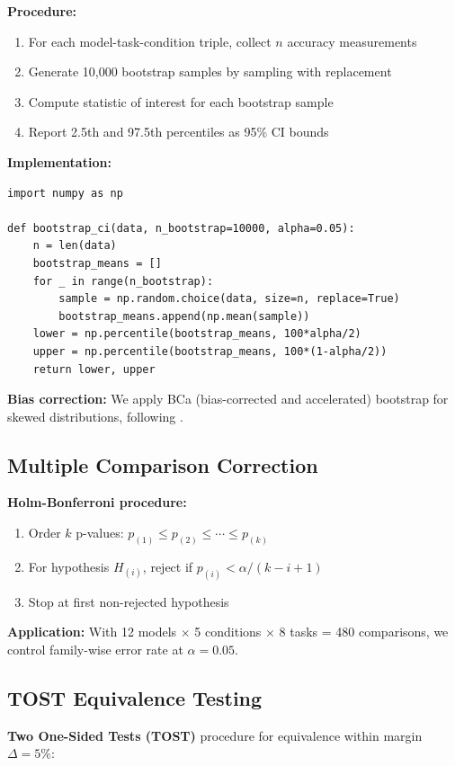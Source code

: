 \documentclass{article}
\theoremstyle{plain}
\theoremstyle{definition}
\theoremstyle{remark}
\begin{document}
\textbf{Procedure:}
\begin{enumerate}
\item For each model-task-condition triple, collect $n$ accuracy measurements
\item Generate 10,000 bootstrap samples by sampling with replacement
\item Compute statistic of interest for each bootstrap sample
\item Report 2.5th and 97.5th percentiles as 95\% CI bounds
\end{enumerate}

\textbf{Implementation:}
\begin{verbatim}
import numpy as np

def bootstrap_ci(data, n_bootstrap=10000, alpha=0.05):
    n = len(data)
    bootstrap_means = []
    for _ in range(n_bootstrap):
        sample = np.random.choice(data, size=n, replace=True)
        bootstrap_means.append(np.mean(sample))
    lower = np.percentile(bootstrap_means, 100*alpha/2)
    upper = np.percentile(bootstrap_means, 100*(1-alpha/2))
    return lower, upper
\end{verbatim}

\textbf{Bias correction:} We apply BCa (bias-corrected and accelerated) bootstrap for skewed distributions, following \citet{efron1987better}.

\subsection{Multiple Comparison Correction}

\textbf{Holm-Bonferroni procedure:}
\begin{enumerate}
\item Order $k$ p-values: $p_{(1)} \leq p_{(2)} \leq \cdots \leq p_{(k)}$
\item For hypothesis $H_{(i)}$, reject if $p_{(i)} < \alpha/(k-i+1)$
\item Stop at first non-rejected hypothesis
\end{enumerate}

\textbf{Application:} With 12 models $\times$ 5 conditions $\times$ 8 tasks = 480 comparisons, we control family-wise error rate at $\alpha = 0.05$.

\subsection{TOST Equivalence Testing}

\textbf{Two One-Sided Tests (TOST)} procedure for equivalence within margin $\Delta = 5\%$:
\end{document}
